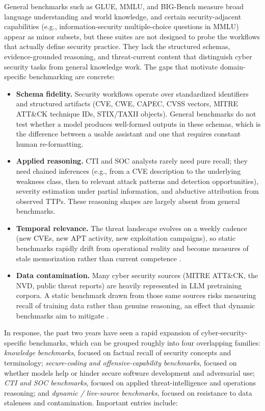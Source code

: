 \documentclass[unnumsec,webpdf,contemporary,large]{oup-authoring-template}
\theoremstyle{thmstyleone}
\theoremstyle{thmstyletwo}
\theoremstyle{thmstylethree}
\begin{document}
General benchmarks such as GLUE, MMLU, and BIG-Bench measure broad language understanding and world knowledge, and certain security-adjacent capabilities (e.g., information-security multiple-choice questions in MMLU) appear as minor subsets, but these suites are not designed to probe the workflows that actually define security practice. They lack the structured schemas, evidence-grounded reasoning, and threat-current content that distinguish cyber security tasks from general knowledge work. The gaps that motivate domain-specific benchmarking are concrete:

\begin{itemize}
  \item \textbf{Schema fidelity.} Security workflows operate over standardized identifiers and structured artifacts (CVE, CWE, CAPEC, CVSS vectors, MITRE ATT\&CK technique IDs, STIX/TAXII objects). General benchmarks do not test whether a model produces well-formed outputs in these schemas, which is the difference between a usable assistant and one that requires constant human re-formatting.
  \item \textbf{Applied reasoning.} CTI and SOC analysts rarely need pure recall; they need chained inferences (e.g., from a CVE description to the underlying weakness class, then to relevant attack patterns and detection opportunities), severity estimation under partial information, and abductive attribution from observed TTPs. These reasoning shapes are largely absent from general benchmarks.
  \item \textbf{Temporal relevance.} The threat landscape evolves on a weekly cadence (new CVEs, new APT activity, new exploitation campaigns), so static benchmarks rapidly drift from operational reality and become measures of stale memorization rather than current competence \cite{alam2025athenabench}.
  \item \textbf{Data contamination.} Many cyber security sources (MITRE ATT\&CK, the NVD, public threat reports) are heavily represented in LLM pretraining corpora. A static benchmark drawn from those same sources risks measuring recall of training data rather than genuine reasoning, an effect that dynamic benchmarks aim to mitigate \cite{alam2025athenabench}.
\end{itemize}

In response, the past two years have seen a rapid expansion of cyber-security-specific benchmarks, which can be grouped roughly into four overlapping families: \emph{knowledge benchmarks}, focused on factual recall of security concepts and terminology; \emph{secure-coding and offensive-capability benchmarks}, focused on whether models help or hinder secure software development and adversarial use; \emph{CTI and SOC benchmarks}, focused on applied threat-intelligence and operations reasoning; and \emph{dynamic / live-source benchmarks}, focused on resistance to data staleness and contamination. Important entries include:
\end{document}
